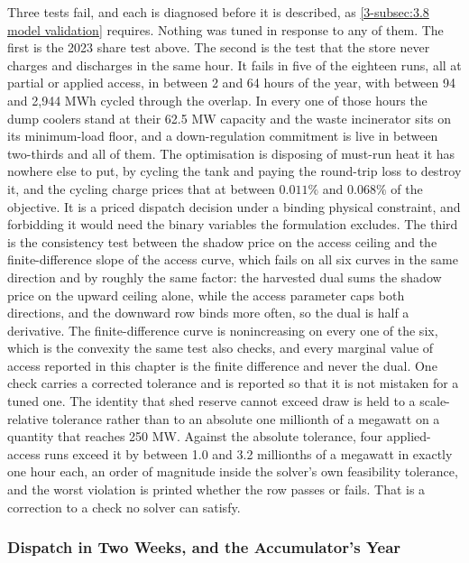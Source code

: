 Three tests fail, and each is diagnosed before it is described, as \autoref{3-subsec:3.8 model validation} requires. Nothing was tuned in response to any of them. The first is the 2023 share test above. The second is the test that the store never charges and discharges in the same hour. It fails in five of the eighteen runs, all at partial or applied access, in between 2 and 64 hours of the year, with between 94 and 2{,}944 MWh cycled through the overlap. In every one of those hours the dump coolers stand at their 62.5 MW capacity and the waste incinerator sits on its minimum-load floor, and a down-regulation commitment is live in between two-thirds and all of them. The optimisation is disposing of must-run heat it has nowhere else to put, by cycling the tank and paying the round-trip loss to destroy it, and the cycling charge prices that at between $0.011\%$ and $0.068\%$ of the objective. It is a priced dispatch decision under a binding physical constraint, and forbidding it would need the binary variables the formulation excludes. The third is the consistency test between the shadow price on the access ceiling and the finite-difference slope of the access curve, which fails on all six curves in the same direction and by roughly the same factor: the harvested dual sums the shadow price on the upward ceiling alone, while the access parameter caps both directions, and the downward row binds more often, so the dual is half a derivative. The finite-difference curve is nonincreasing on every one of the six, which is the convexity the same test also checks, and every marginal value of access reported in this chapter is the finite difference and never the dual. One check carries a corrected tolerance and is reported so that it is not mistaken for a tuned one. The identity that shed reserve cannot exceed draw is held to a scale-relative tolerance rather than to an absolute one millionth of a megawatt on a quantity that reaches 250 MW. Against the absolute tolerance, four applied-access runs exceed it by between 1.0 and 3.2 millionths of a megawatt in exactly one hour each, an order of magnitude inside the solver's own feasibility tolerance, and the worst violation is printed whether the row passes or fails. That is a correction to a check no solver can satisfy.

\subsubsection{Dispatch in Two Weeks, and the Accumulator's Year}
\label{4-subsec:4.0.3 dispatch}

